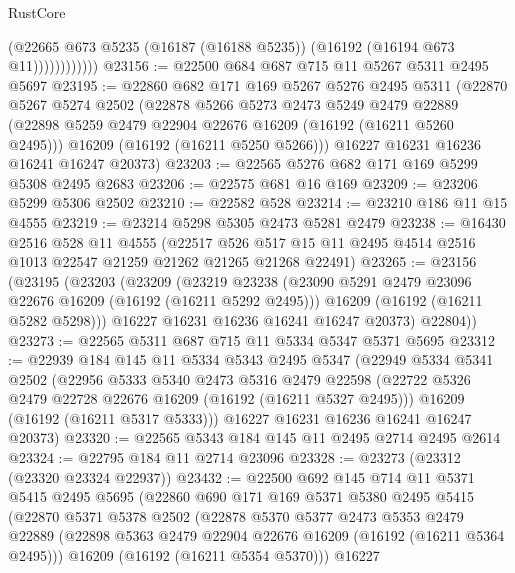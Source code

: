 \begin{lexlean}{RustCore}
\begin{coremodule}
                      (@22665
                        @673
                        @5235
                        (@16187 (@16188 @5235))
                        (@16192 (@16194 @673 @11))))))))))))
@23156 := @22500 @684 @687 @715 @11 @5267 @5311 @2495 @5697
@23195 := @22860
    @682
    @171
    @169
    @5267
    @5276
    @2495
    @5311
    (@22870
      @5267
      @5274
      @2502
      (@22878
        @5266
        @5273
        @2473
        @5249
        @2479
        @22889
        (@22898 @5259 @2479 @22904 @22676 @16209 (@16192 (@16211 @5260 @2495)))
        @16209
        (@16192 (@16211 @5250 @5266)))
      @16227
      @16231
      @16236
      @16241
      @16247
      @20373)
@23203 := @22565 @5276 @682 @171 @169 @5299 @5308 @2495 @2683
@23206 := @22575 @681 @16 @169
@23209 := @23206 @5299 @5306 @2502
@23210 := @22582 @528
@23214 := @23210 @186 @11 @15 @4555
@23219 := @23214 @5298 @5305 @2473 @5281 @2479
@23238 := @16430
    @2516
    @528
    @11
    @4555
    (@22517 @526 @517 @15 @11 @2495 @4514 @2516 @1013 @22547 @21259 @21262 @21265 @21268 @22491)
@23265 := @23156
    (@23195
      (@23203
        (@23209
          (@23219
            @23238
            (@23090 @5291 @2479 @23096 @22676 @16209 (@16192 (@16211 @5292 @2495)))
            @16209
            (@16192 (@16211 @5282 @5298)))
          @16227
          @16231
          @16236
          @16241
          @16247
          @20373)
        @22804))
@23273 := @22565 @5311 @687 @715 @11 @5334 @5347 @5371 @5695
@23312 := @22939
    @184
    @145
    @11
    @5334
    @5343
    @2495
    @5347
    (@22949
      @5334
      @5341
      @2502
      (@22956
        @5333
        @5340
        @2473
        @5316
        @2479
        @22598
        (@22722 @5326 @2479 @22728 @22676 @16209 (@16192 (@16211 @5327 @2495)))
        @16209
        (@16192 (@16211 @5317 @5333)))
      @16227
      @16231
      @16236
      @16241
      @16247
      @20373)
@23320 := @22565 @5343 @184 @145 @11 @2495 @2714 @2495 @2614
@23324 := @22795 @184 @11 @2714 @23096
@23328 := @23273 (@23312 (@23320 @23324 @22937))
@23432 := @22500
    @692
    @145
    @714
    @11
    @5371
    @5415
    @2495
    @5695
    (@22860
      @690
      @171
      @169
      @5371
      @5380
      @2495
      @5415
      (@22870
        @5371
        @5378
        @2502
        (@22878
          @5370
          @5377
          @2473
          @5353
          @2479
          @22889
          (@22898 @5363 @2479 @22904 @22676 @16209 (@16192 (@16211 @5364 @2495)))
          @16209
          (@16192 (@16211 @5354 @5370)))
        @16227

\end{coremodule}
\end{lexlean}
